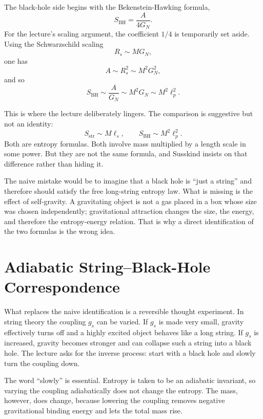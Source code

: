 The black-hole side begins with the Bekenstein-Hawking formula,
\begin{equation}
S_{\mathrm{BH}}=\frac{A}{4G_N}.
\end{equation}
For the lecture's scaling argument, the coefficient \(1/4\) is temporarily set aside. Using the Schwarzschild scaling
\begin{equation}
R_s \sim M G_N,
\end{equation}
one has
\begin{equation}
A \sim R_s^2 \sim M^2 G_N^2,
\end{equation}
and so
\begin{equation}
S_{\mathrm{BH}} \sim \frac{A}{G_N} \sim M^2 G_N \sim M^2 \ell_p^2.
\end{equation}

This is where the lecture deliberately lingers. The comparison is suggestive but not an identity:
\[
S_{\mathrm{str}} \sim M\ell_s,
\qquad
S_{\mathrm{BH}} \sim M^2\ell_p^2.
\]
Both are entropy formulas. Both involve mass multiplied by a length scale in some power. But they are not the same formula, and Susskind insists on that difference rather than hiding it.

The naive mistake would be to imagine that a black hole is ``just a string'' and therefore should satisfy the free long-string entropy law. What is missing is the effect of self-gravity. A gravitating object is not a gas placed in a box whose size was chosen independently; gravitational attraction changes the size, the energy, and therefore the entropy-energy relation. That is why a direct identification of the two formulas is the wrong idea.

\section{Adiabatic String--Black-Hole Correspondence}

What replaces the naive identification is a reversible thought experiment. In string theory the coupling \(g_s\) can be varied. If \(g_s\) is made very small, gravity effectively turns off and a highly excited object behaves like a long string. If \(g_s\) is increased, gravity becomes stronger and can collapse such a string into a black hole. The lecture asks for the inverse process: start with a black hole and slowly turn the coupling down.

The word ``slowly'' is essential. Entropy is taken to be an adiabatic invariant, so varying the coupling adiabatically does not change the entropy. The mass, however, does change, because lowering the coupling removes negative gravitational binding energy and lets the total mass rise.

